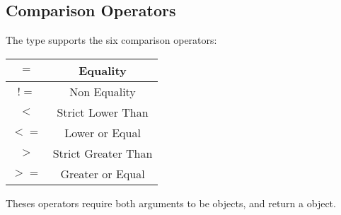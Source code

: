 \subsection{Comparison Operators}

The  type supports the six comparison operators:\newline

\begin{tabular}{|c|c|}
\hline
$=$ & Equality \\
\hline
$!=$ & Non Equality \\
\hline
$<$  & Strict Lower Than \\
\hline
$<=$  & Lower or Equal \\
\hline
$>$  & Strict Greater Than \\
\hline
$>=$  & Greater or Equal \\
\hline
\end{tabular}\newline

Theses operators require both arguments to be  objects, and return a  object.


